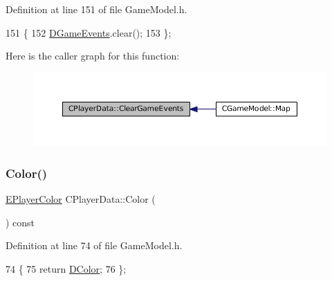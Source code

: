 Definition at line 151 of file Game\+Model.\+h.


\begin{DoxyCode}
151                               \{
152             \hyperlink{classCPlayerData_a9a7af43e88055d6d1a384a8817a655a0}{DGameEvents}.clear();  
153         \};
\end{DoxyCode}
Here is the caller graph for this function\+:\nopagebreak
\begin{figure}[H]
\begin{center}
\leavevmode
\includegraphics[width=350pt]{classCPlayerData_a74cbe8bf72037ca113c9c40ae7bca5ec_icgraph}
\end{center}
\end{figure}
\hypertarget{classCPlayerData_a4f313db2728a8be2b24484515a2445df}{}\label{classCPlayerData_a4f313db2728a8be2b24484515a2445df} 
\subsubsection{\texorpdfstring{Color()}{Color()}}
{\footnotesize\ttfamily \hyperlink{GameDataTypes_8h_aafb0ca75933357ff28a6d7efbdd7602f}{E\+Player\+Color} C\+Player\+Data\+::\+Color (\begin{DoxyParamCaption}{ }\end{DoxyParamCaption}) const\hspace{0.3cm}{\ttfamily [inline]}}



Definition at line 74 of file Game\+Model.\+h.


\begin{DoxyCode}
74                                   \{
75             \textcolor{keywordflow}{return} \hyperlink{classCPlayerData_a65d69aaa09c8fc0f7ddfa5e858313085}{DColor};
76         \};
\end{DoxyCode}
\hypertarget{classCPlayerData_a4d203da2adbd6d00b0cd5b334bddba4f}{}\label{classCPlayerData_a4d203da2adbd6d00b0cd5b334bddba4f} 

